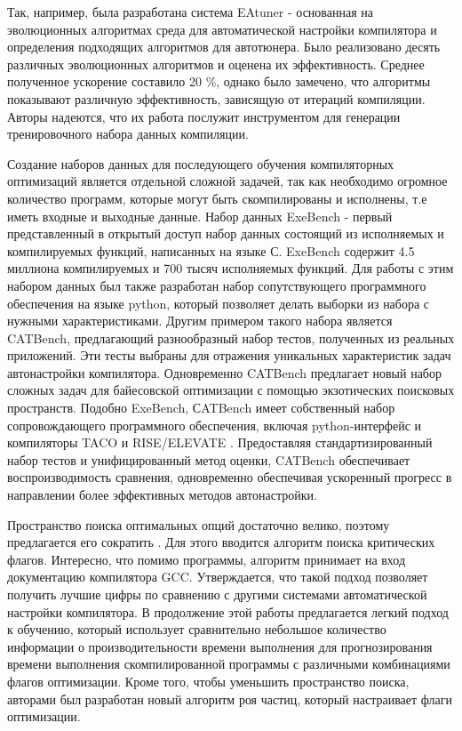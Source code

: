 Так, например, была разработана система EAtuner \cite{xiao2024eatuner} -  основанная на эволюционных алгоритмах среда для автоматической настройки компилятора и определения подходящих алгоритмов для автотюнера. Было реализовано десять различных эволюционных алгоритмов и оценена их эффективность. Среднее полученное ускорение составило 20 \%, однако было замечено, что алгоритмы показывают различную эффективность, зависящую от итераций компиляции. Авторы надеются, что их работа послужит инструментом для генерации тренировочного набора данных компиляции. 

Создание наборов данных для последующего обучения компиляторных оптимизаций является отдельной сложной задачей, так как необходимо огромное количество программ, которые могут быть скомпилированы и исполнены, т.е иметь входные и выходные данные. Набор данных ExeBench \cite{armengol2022exebench}  - первый представленный в открытый доступ набор данных состоящий из исполняемых и компилируемых функций, написанных на языке С. ExeBench содержит 4.5 миллиона компилируемых и 700 тысяч исполняемых функций. Для работы с этим набором данных был также разработан набор сопутствующего программного обеспечения на языке python, который позволяет делать выборки из набора с нужными характеристиками. Другим примером такого набора является CATBench, предлагающий разнообразный набор тестов, полученных из реальных приложений.
Эти тесты выбраны для отражения уникальных характеристик задач автонастройки компилятора.
Одновременно CATBench предлагает новый набор сложных задач для байесовской оптимизации с помощью
экзотических поисковых пространств. Подобно ExeBench, СATBench имеет собственный набор сопровождающего программного обеспечения, включая python-интерфейс и компиляторы TACO \cite{kjolstad2017taco} и RISE/ELEVATE \cite{steuwer2022rise}.
Предоставляя стандартизированный набор тестов и унифицированный метод оценки, CATBench обеспечивает воспроизводимость сравнения, одновременно обеспечивая ускоренный прогресс в направлении более эффективных методов автонастройки.

Пространство поиска оптимальных опций достаточно велико, поэтому предлагается его сократить \cite{zhu2023compiler}. Для этого вводится алгоритм поиска критических флагов. Интересно, что помимо программы, алгоритм принимает на вход документацию компилятора GCC. Утверждается, что такой подход позволяет получить лучшие цифры по сравнению с другими системами автоматической настройки компилятора.  В продолжение этой работы \cite{zhu2024compiler} предлагается легкий подход к обучению, который использует сравнительно небольшое количество информации о производительности времени выполнения для прогнозирования времени выполнения скомпилированной программы с различными комбинациями флагов оптимизации. Кроме того, чтобы уменьшить пространство поиска, авторами был разработан новый алгоритм роя частиц, который настраивает флаги оптимизации.



